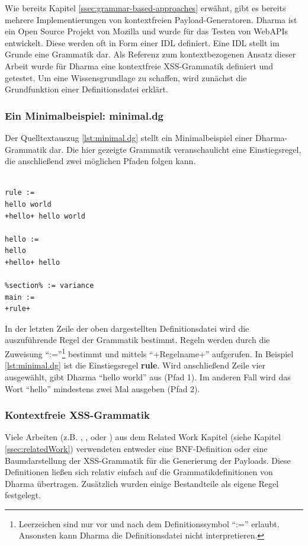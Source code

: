 Wie bereits Kapitel \ref{ssec:grammar-based-approaches} erwähnt, gibt es bereits mehrere Implementierungen von kontextfreien Payload-Generatoren. Dharma ist ein Open Source Projekt von Mozilla und wurde für das Testen von WebAPIs entwickelt. Diese werden oft in Form einer \ac{IDL} definiert. Eine IDL stellt im Grunde eine Grammatik dar. Als Referenz zum kontextbezogenen Ansatz dieser Arbeit wurde für Dharma eine kontextfreie \ac{XSS}-Grammatik definiert und getestet. Um eine Wissensgrundlage zu schaffen, wird zunächst die Grundfunktion einer Definitionsdatei erklärt.

\newpage
\subsubsection{Ein Minimalbeispiel: minimal.dg}

Der Quelltextauszug \ref{lst:minimal.dg} stellt ein Minimalbeispiel einer Dharma-Grammatik dar. Die hier gezeigte Grammatik veranschaulicht eine Einstiegsregel, die anschließend zwei möglichen Pfaden folgen kann.

\begin{lstlisting}[caption={Dharma: Grundaufbau einer Grammatikdefinition},label=lst:minimal.dg]
%section% := value

rule :=
hello world
+hello+ hello world

hello :=
hello
+hello+ hello

%section% := variance
main :=
+rule+
\end{lstlisting}

In der letzten Zeile der oben dargestellten Definitionsdatei wird die auszuführende Regel der Grammatik bestimmt. Regeln werden durch die Zuweisung ``:=''\footnote{
Leerzeichen sind nur vor und nach dem Definitionssymbol ``:='' erlaubt. Ansonsten kann Dharma die Definitionsdatei nicht interpretieren.} bestimmt und mittels ``+Regelname+'' aufgerufen. In Beispiel \ref{lst:minimal.dg} ist die Einstiegsregel \textbf{rule}. Wird anschließend Zeile vier ausgewählt, gibt Dharma ``hello world'' aus (Pfad 1). Im anderen Fall wird das Wort ``hello'' mindestens zwei Mal ausgeben (Pfad 2).

\subsubsection{Kontextfreie XSS-Grammatik}

Viele Arbeiten (z.B. \cite{Bozic}, \cite{Simos2014}, \cite{Wies2014} oder \cite{Duchene2014}) aus dem Related Work Kapitel (siehe Kapitel \ref{ssec:relatedWork}) verwendeten entweder eine \gls{BNF}-Definition oder eine Baumdarstellung der \ac{XSS}-Grammatik für die Generierung der Payloads. Diese Definitionen ließen sich relativ einfach auf die Grammatikdefinitionen von Dharma übertragen. Zusätzlich wurden einige Bestandteile als eigene Regel festgelegt. 

